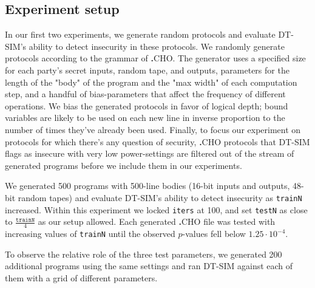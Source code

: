 \documentclass[acmlarge, manuscript, screen, review, anonymous, table]{acmart}
\newcommand{\langname}{\textsc{\textbf{.}CHO}\xspace}
\newcommand{\toolname}{\textsc{DT-SIM}\xspace}
\begin{document}
\subsection{Experiment setup}
In our first two experiments, we generate random protocols and evaluate \toolname's ability to detect insecurity in these protocols.
We randomly generate protocols according to the grammar of \langname.
The generator uses a specified size for each party's secret inputs, random tape, and outputs,
parameters for the length of the "body" of the program and the "max width" of each computation step,
and a handful of bias-parameters that affect the frequency of different operations.
We bias the generated protocols in favor of logical depth;
bound variables are likely
to be used on each new line in inverse proportion to the number of times they've already been used.
Finally, to focus our experiment on protocols for which there's any question of security,
\langname protocols that \toolname flags as insecure with very low power-settings
are filtered out of the stream of generated programs before we include them in our experiments.

We generated 500 programs with 500-line bodies (16-bit inputs and outputs, 48-bit random tapes)
and evaluate \toolname's ability to detect insecurity as \texttt{trainN} increased.
Within this experiment we locked \texttt{iters} at 100, and set \texttt{testN} as close to $\frac{\mathtt{trainN}}{4}$ as our setup allowed.
Each generated \langname file was tested with increasing values of \texttt{trainN} until the observed $p$-values fell below $1.25 \cdot 10^{-4}$.

To observe the relative role of the three test parameters, we generated 200 additional programs using the same settings
and ran \toolname against each of them with a grid of different parameters.
\end{document}

